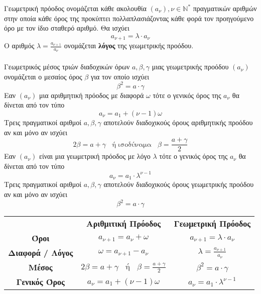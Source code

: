 \documentclass[twoside,nofonts,internet,shmeiwseis]{thewria}
\begin{document}
Γεωμετρική πρόοδος ονομάζεται κάθε ακολουθία $ (a_\nu),\nu\in\mathbb{N}^* $ πραγματικών αριθμών στην οποία κάθε όρος της προκύπτει πολλαπλασιάζοντας κάθε φορά τον προηγούμενο όρο με τον ίδιο σταθερό αριθμό. Θα ισχύει
\[ a_{\nu+1}=\lambda\cdot a_\nu \]
Ο αριθμός $ \lambda=\frac{a_{\nu+1}}{a_\nu} $ ονομάζεται \textbf{λόγος} της γεωμετρικής προόδου.\\\\
Γεωμετρικός μέσος τριών διαδοχικών όρων $ a,\beta,\gamma $ μιας γεωμετρικής προόδου $ (a_\nu) $ ονομάζεται ο μεσαίος όρος $ \beta $ για τον οποίο ισχύει \[ \beta^2=a\cdot\gamma \] 
\thewrhmata
{}
Εαν $ (a_\nu) $ μια αριθμητική πρόοδος με διαφορά $ \omega $ τότε ο γενικός όρος της $ a_\nu $ θα δίνεται από τον τύπο \[ a_\nu=a_1+(\nu-1)\omega \]
Τρεις πραγματικοί αριθμοί $ a,\beta,\gamma $ αποτελούν διαδοχικούς όρους αριθμητικής προόδου αν και μόνο αν ισχύει \[ 2\beta=a+\gamma\;\;\textrm{ ή ισοδύναμα }\;\;\beta=\frac{a+\gamma}{2} \]
Εαν $ (a_\nu) $ είναι μια γεωμετρική πρόοδος με λόγο $ \lambda $ τότε ο γενικός όρος της $ a_\nu $ θα δίνεται από τον τύπο \[ a_\nu=a_1\cdot\lambda^{\nu-1} \]
Τρεις πραγματικοί αριθμοί $ a,\beta,\gamma $ αποτελούν διαδοχικούς όρους γεωμετρικής προόδου αν και μόνο αν ισχύει \[ \beta^2=a\cdot\gamma \]
\begin{center}
\begin{tabular}{ccc}
\hline \rule[-2ex]{0pt}{5.5ex}  & \textbf{Αριθμιτική Πρόοδος} & \textbf{Γεωμετρική Πρόοδος} \\ 
\hhline{===} \rule[-2ex]{0pt}{5.5ex} \textbf{Όροι} & $ a_{\nu+1}=a_\nu+\omega $ & $ a_{\nu+1}=\lambda\cdot a_\nu $ \\ 
 \rule[-2ex]{0pt}{5.5ex} \textbf{Διαφορά / Λόγος} & $ \omega=a_{\nu+1}-a_\nu $ & $ \lambda=\frac{a_{\nu+1}}{a_\nu} $ \\ 
 \rule[-2ex]{0pt}{5.5ex} \textbf{Μέσος} & $ 2\beta=a+\gamma\;\;\textrm{ ή }\;\;\beta=\frac{a+\gamma}{2} $ & $ \beta^2=a\cdot\gamma $ \\ 
 \rule[-2ex]{0pt}{5.5ex} \textbf{Γενικός Όρος} & $ a_\nu=a_1+(\nu-1)\omega $ & $ a_\nu=a_1\cdot\lambda^{\nu-1} $ \\ 
\hline 
\end{tabular} 
\end{center}
\end{document}
